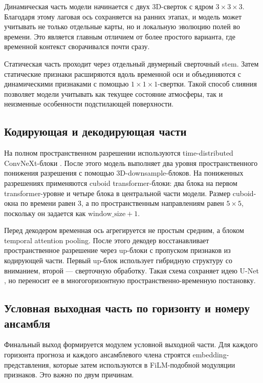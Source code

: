 Динамическая часть модели начинается с двух 3D-сверток с ядром \(3\times3\times3\). Благодаря этому лаговая ось сохраняется на ранних этапах, и модель может учитывать не только отдельные карты, но и локальную эволюцию полей во времени. Это является главным отличием от более простого варианта, где временной контекст сворачивался почти сразу.

Статическая часть проходит через отдельный двумерный сверточный stem. Затем статические признаки расширяются вдоль временной оси и объединяются с динамическими признаками с помощью \(1\times1\times1\)-свертки. Такой способ слияния позволяет модели учитывать как текущее состояние атмосферы, так и неизменные особенности подстилающей поверхности.

\subsection{Кодирующая и декодирующая части}

На полном пространственном разрешении используются time-distributed ConvNeXt-блоки \cite{convnext2022}. После этого модель выполняет два уровня пространственного понижения разрешения с помощью 3D-downsample-блоков. На пониженных разрешениях применяются cuboid transformer-блоки: два блока на первом transformer-уровне и четыре блока в центральной части модели. Размер cuboid-окна по времени равен 3, а по пространственным направлениям равен \(5\times5\), поскольку он задается как \(\text{window\_size}+1\).

Перед декодером временная ось агрегируется не простым средним, а блоком temporal attention pooling. После этого декодер восстанавливает пространственное разрешение через up-блоки с пропуском признаков из кодирующей части. Первый up-блок использует гибридную структуру со вниманием, второй — сверточную обработку. Такая схема сохраняет идею U-Net \cite{unet2015}, но переносит ее в многогоризонтную пространственно-временную постановку.

\subsection{Условная выходная часть по горизонту и номеру ансамбля}

Финальный выход формируется модулем условной выходной части. Для каждого горизонта прогноза и каждого ансамблевого члена строятся embedding-представления, которые затем используются в FiLM-подобной модуляции признаков. Это важно по двум причинам.

